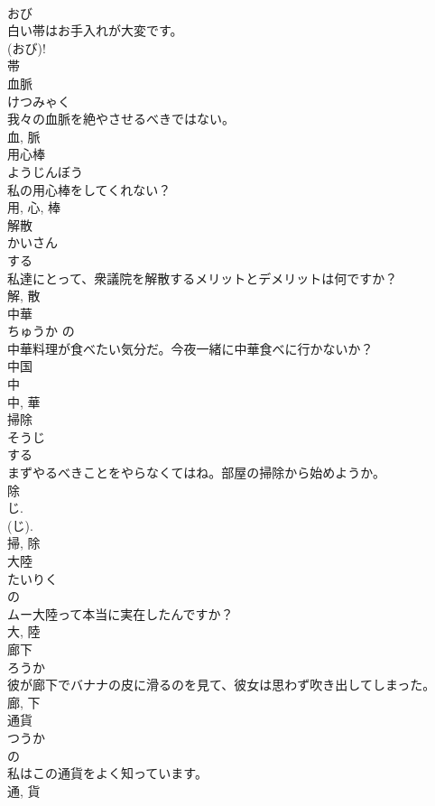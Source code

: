 \documentclass[8pt]{extreport}
\begin{document}
\begin{CJK}{UTF8}{min}
\\	おび	
\\	白い帯はお手入れが大変です。	
\\	(おび)! 
\\	帯	
\\	血脈	
\\	けつみゃく	
\\	我々の血脈を絶やさせるべきではない。	
\\	血, 脈	
\\	用心棒	
\\	ようじんぼう	
\\	私の用心棒をしてくれない？	
\\	用, 心, 棒	
\\	解散	
\\	かいさん	
\\	する 
\\	私達にとって、衆議院を解散するメリットとデメリットは何ですか？	
\\	解, 散	
\\	中華	
\\	ちゅうか	の 
\\	中華料理が食べたい気分だ。今夜一緒に中華食べに行かないか？	
\\	中国 
\\	中 
\\	中, 華	
\\	掃除	
\\	そうじ	
\\	する 
\\	まずやるべきことをやらなくてはね。部屋の掃除から始めようか。	
\\	除 
\\	じ. 
\\	(じ). 
\\	掃, 除	
\\	大陸	
\\	たいりく	
\\	の 
\\	ムー大陸って本当に実在したんですか？	
\\	大, 陸	
\\	廊下	
\\	ろうか	
\\	彼が廊下でバナナの皮に滑るのを見て、彼女は思わず吹き出してしまった。	
\\	廊, 下	
\\	通貨	
\\	つうか	
\\	の 
\\	私はこの通貨をよく知っています。	
\\	通, 貨	

\end{CJK}
\end{document}
